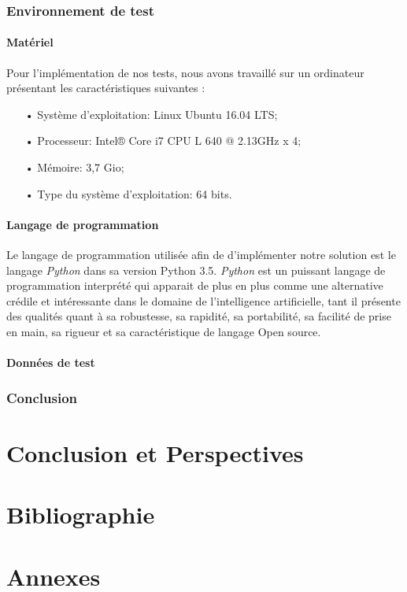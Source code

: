 \documentclass[12pt,a4paper]{article}
\begin{document}
		\section{Environnement de test} 
		
		\subsection{Matériel}
		Pour l'implémentation de nos tests, nous avons travaillé sur un ordinateur présentant les caractéristiques suivantes :\\
		\begin{itemize}
			\item[•] Système d'exploitation: Linux Ubuntu 16.04 LTS; \\
			\item[•] Processeur: Intel®  Core  i7 CPU L 640 @ 2.13GHz x 4; \\
			\item[•] Mémoire: 3,7 Gio;\\
			\item[•] Type du système d'exploitation: 64 bits.\\
		\end{itemize}
		\subsection{Langage de programmation}
		Le langage de programmation utilisée afin de d'implémenter notre solution est le langage \emph{Python} dans sa version Python 3.5. \emph{Python} est un puissant langage de programmation interprété qui apparait de plus en plus comme une alternative crédile et intéressante dans le domaine de l'intelligence artificielle, tant il présente des qualités quant à sa robustesse, sa rapidité, sa portabilité, sa facilité de prise en main, sa rigueur et sa caractéristique de langage Open source.  
		\subsection{Données de test}
		\section*{Conclusion}
		
	\newpage
		
	\part*{Conclusion et Perspectives}
	
	\part*{Bibliographie}
	\part*{Annexes}
\end{document}
